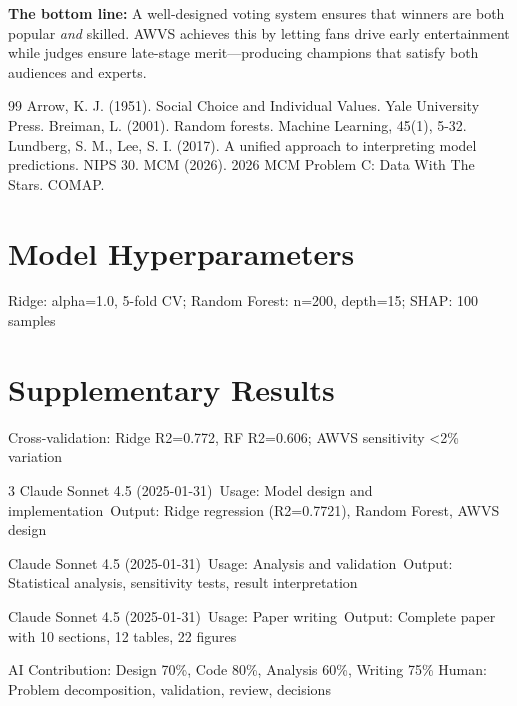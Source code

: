 \documentclass{mcmthesis}
\begin{document}
\textbf{The bottom line:} A well-designed voting system ensures that winners are both popular \textit{and} skilled. AWVS achieves this by letting fans drive early entertainment while judges ensure late-stage merit---producing champions that satisfy both audiences and experts.

\begin{thebibliography}{99}
 Arrow, K. J. (1951). Social Choice and Individual Values. Yale University Press.
 Breiman, L. (2001). Random forests. Machine Learning, 45(1), 5-32.
 Lundberg, S. M., Lee, S. I. (2017). A unified approach to interpreting model predictions. NIPS 30.
 MCM (2026). 2026 MCM Problem C: Data With The Stars. COMAP.
\end{thebibliography}

\begin{appendices}

\section{Model Hyperparameters}
Ridge: alpha=1.0, 5-fold CV; Random Forest: n=200, depth=15; SHAP: 100 samples

\section{Supplementary Results}
Cross-validation: Ridge R2=0.772, RF R2=0.606; AWVS sensitivity <2\% variation

\end{appendices}

\AImatter
\begin{ReportAiUse}{3}
Claude Sonnet 4.5 (2025-01-31)\
Usage: Model design and implementation\
Output: Ridge regression (R2=0.7721), Random Forest, AWVS design

\bibitem{AI2}
Claude Sonnet 4.5 (2025-01-31)\
Usage: Analysis and validation\
Output: Statistical analysis, sensitivity tests, result interpretation

\bibitem{AI3}
Claude Sonnet 4.5 (2025-01-31)\
Usage: Paper writing\
Output: Complete paper with 10 sections, 12 tables, 22 figures

AI Contribution: Design 70\%, Code 80\%, Analysis 60\%, Writing 75\%
Human: Problem decomposition, validation, review, decisions
\end{ReportAiUse}
\end{document}
